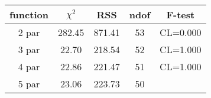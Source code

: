 \begin{tabular}{c|c|c|c|c}
function & $\chi^2$ & RSS & ndof & F-test \\
\hline
2 par & 282.45 & 871.41 & 53 & CL=0.000 \\
3 par & 22.70 & 218.54 & 52 & CL=1.000 \\
4 par & 22.86 & 221.47 & 51 & CL=1.000 \\
5 par & 23.06 & 223.73 & 50 & \\
\hline
\end{tabular}